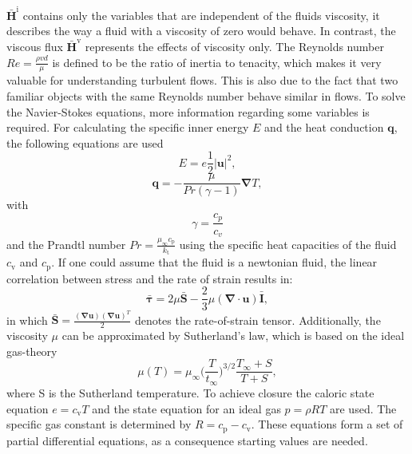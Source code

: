 \documentclass[11pt,a4paper,openany,oneside,parskip=half*]{article}
\renewcommand*\vec[1]{\boldsymbol{#1}}
\renewcommand*\matrix[1]{\boldsymbol{#1}}
\begin{document}
$ \vec{\bar{H}^\mathrm{i}} $ contains only the variables that are independent of the fluids viscosity, it describes the way a fluid 
with a viscosity of zero would behave. In contrast, the viscous flux $ \vec{\bar{H}^\mathrm{v}} $ represents the effects of viscosity only. The Reynolds number 
$ Re = \frac{\rho v d}{\mu} $ is defined to be the ratio of inertia to tenacity, which makes it very valuable for understanding turbulent flows. This is also due to the 
fact that two familiar objects with the same Reynolds number behave similar in flows.
To solve the Navier-Stokes equations, more information regarding some variables is required. For calculating the specific inner energy $ E $ 
and the heat conduction $ \vec{q} $, the following equations are used
\begin{equation}
 E = e  \frac{1}{2} \vec{|u|}^2,
\end{equation}
\begin{equation}
 \vec{q} = - \frac{\mu}{Pr (\gamma - 1)} \vec\nabla T,
\end{equation}
with 
\begin{equation}
 \gamma = \frac{c_p}{c_v}
\end{equation}
and the Prandtl number
$ Pr = \frac{\mu_\infty c_\mathrm{p}}{k_\mathrm{t}}$
using the specific heat capacities of the fluid $ c_\mathrm{v} $ and $ c_\mathrm{p} $.
If one could assume that the fluid is a newtonian fluid, the linear correlation between stress and the rate of strain results in:
\nomenclature[rI]{$\matrix{\bar{I}}$}{Identity tensor}
\nomenclature[rS]{$\matrix{S}$}{Rate-of-strain tensor}
\begin{equation}
 \matrix{\bar{\tau}} = 2 \mu \matrix{\bar{S}} - \frac{2}{3} \mu (\vec\nabla \cdot \vec{u}) \matrix{\bar{I}},
\end{equation}
in which $ \matrix{\bar{S}} = \frac{(\vec\nabla \vec{u})(\vec\nabla \vec{u})^T}{2} $ denotes the rate-of-strain tensor. Additionally, the viscosity
$ \mu $ can be approximated by Sutherland's law, which is based on the ideal gas-theory
\begin{equation}
 \mu (T) = \mu_\infty \biggl(\frac{T}{t_\infty}\biggl)^{3/2} \frac{T_\infty + S}{T + S},
\end{equation}
where S is the Sutherland temperature.
To achieve closure the caloric state equation $ e = c_\mathrm{v} T $ and the state equation for an ideal gas $
p = \rho R T $ are used. The specific gas constant is determined by $ R = c_\mathrm{p} - c_\mathrm{v} $. 
These equations form a set of partial differential equations, as a consequence starting values are needed.
\pagebreak
\end{document}
